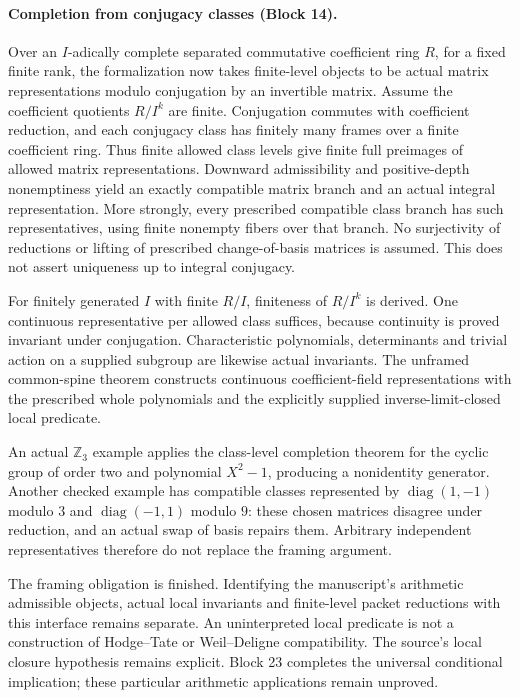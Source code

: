 \documentclass[11pt]{article}
\theoremstyle{definition}
\theoremstyle{remark}
\begin{document}
\paragraph{Completion from conjugacy classes (Block 14).}
Over an $I$-adically complete separated commutative coefficient ring $R$,
for a fixed finite rank, the formalization now takes finite-level objects to be
actual matrix representations modulo conjugation by an invertible matrix.
Assume the coefficient quotients $R/I^k$ are finite.
Conjugation commutes with coefficient reduction, and each conjugacy class has
finitely many frames over a finite coefficient ring. Thus finite allowed class
levels give finite full preimages of allowed matrix representations. Downward
admissibility and positive-depth nonemptiness yield an exactly compatible
matrix branch and an actual integral representation. More strongly, every
prescribed compatible class branch has such representatives, using finite
nonempty fibers over that branch. No surjectivity of reductions or lifting of
prescribed change-of-basis matrices is assumed. This does not assert uniqueness
up to integral conjugacy.

For finitely generated $I$ with finite $R/I$, finiteness of $R/I^k$ is derived.
One continuous representative per allowed class suffices, because continuity
is proved invariant under conjugation. Characteristic polynomials, determinants
and trivial action on a supplied subgroup are likewise actual invariants.
The unframed common-spine theorem constructs continuous coefficient-field
representations with the prescribed whole polynomials and the explicitly
supplied inverse-limit-closed local predicate.

An actual $\mathbb Z_3$ example applies the class-level completion theorem
for the cyclic group of order two and polynomial $X^2-1$, producing a nonidentity generator. Another
checked example has compatible classes represented by
$\operatorname{diag}(1,-1)$ modulo $3$ and
$\operatorname{diag}(-1,1)$ modulo $9$: these chosen matrices disagree under
reduction, and an actual swap of basis repairs them. Arbitrary independent
representatives therefore do not replace the framing argument.

The framing obligation is finished. Identifying the manuscript's arithmetic
admissible objects, actual local invariants and finite-level packet reductions
with this interface remains separate. An uninterpreted local predicate is not
a construction of Hodge--Tate or Weil--Deligne compatibility. The source's local
closure hypothesis remains explicit. Block 23 completes the universal
conditional implication; these particular arithmetic applications remain
unproved.
\end{document}
